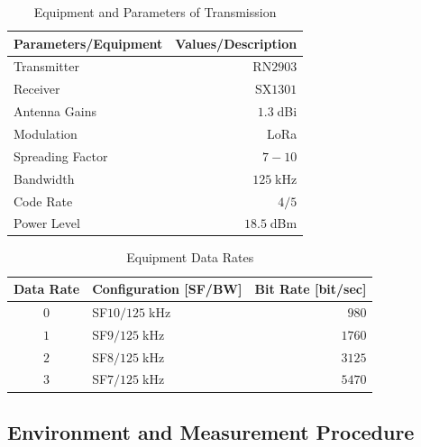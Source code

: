 \begin{table}[!htb]
  \centering
  \caption{Equipment and Parameters of Transmission \cite{Microchip2016a}}
  \label{tab:EquipmentandParameters}
  \resizebox{8cm}{!} {
    \begin{tabular}{lr}
      \toprule
      \textbf{Parameters/Equipment} & \textbf{Values/Description} \\ 
      \midrule
      Transmitter & RN$2903$\\ 
      Receiver & SX$1301$\\ 
      Antenna Gains & $1.3\;$dBi\\ 
      Modulation & LoRa\\ 
      Spreading Factor & $7-10$\\
      Bandwidth & $125\;$kHz\\ 
      Code Rate & $4/5$\\ 
      Power Level & $18.5\;$dBm\\ 
      \bottomrule
    \end{tabular}
  }
\end{table}


\begin{table}[!htb]
  \centering
  \caption{Equipment Data Rates \cite{N.SorninSemtechM.LuisSemtechT.EirichIBMT.KrampIBM2015}}
  \label{tab:datarates}
  \resizebox{9cm}{!} {
    \begin{tabular}{clr}
      \toprule
      \multicolumn{1}{l}{\textbf{Data Rate}} & \textbf{Configuration {[}SF/BW{]}} & \multicolumn{1}{l}{\textbf{Bit Rate {[}bit/sec{]}}} \\
      \midrule
      $0$                             & SF$10 / 125\;$kHz            & $980$                                        \\
      $1$                             & SF$9 / 125\;$kHz             & $1760$                                       \\
      $2$                             & SF$8 / 125\;$kHz             & $3125$                                       \\
      $3$                             & SF$7 / 125\;$kHz             & $5470$                                     \\
      \bottomrule
    \end{tabular}
  }
\end{table}

\subsection{Environment and Measurement Procedure}

